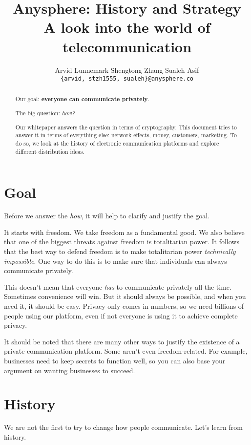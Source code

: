 \documentclass[sigconf, nonacm, balance=false, natbib=false]{acmart}
\title{\textbf{Anysphere: History and Strategy} \\ \vspace{0.4cm} {\huge \normalfont A look into the world of telecommunication}}
\date{\dateinfo}
\author{Arvid Lunnemark \hspace{0.7cm} Shengtong Zhang \hspace{0.7cm} Sualeh Asif \\ \vspace{0.1cm} \nolinkurl{{arvid, stzh1555, sualeh}@anysphere.co} \\ \vspace{0.4cm} \dateinfo}
\begin{document}
\pagecolor{pagecolor}

\begin{abstract}
    Our goal: \textbf{everyone can communicate privately}.

    The big question: \textit{how?}

    Our whitepaper answers the question in terms of cryptography. This document tries to answer it in terms of everything else: network effects, money, customers, marketing. To do so, we look at the history of electronic communication platforms and explore different distribution ideas.
\end{abstract}

\maketitle

\tableofcontents

\section{Goal}

Before we answer the \textit{how}, it will help to clarify and justify the goal.

It starts with freedom. We take freedom as a fundamental good. We also believe that one of the biggest threats against freedom is totalitarian power. It follows that the best way to defend freedom is to make totalitarian power \textit{technically impossible}. One way to do this is to make sure that individuals can always communicate privately.

This doesn't mean that everyone \textit{has} to communicate privately all the time. Sometimes convenience will win. But it should always be possible, and when you need it, it should be easy. Privacy only comes in numbers, so we need billions of people using our platform, even if not everyone is using it to achieve complete privacy.

It should be noted that there are many other ways to justify the existence of a private communication platform. Some aren't even freedom-related. For example, businesses need to keep secrets to function well, so you can also base your argument on wanting businesses to succeed.

\section{History}

We are not the first to try to change how people communicate. Let's learn from history.
\end{document}
